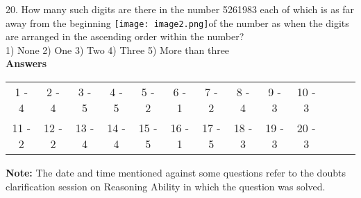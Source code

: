 \documentclass[
]{article}
\begin{document}
20. How many such digits are there in the number 5261983 each of which is as far away from
the beginning \texttt{[image: image2.png]}of the number as when the digits are arranged in the ascending order within
the number?\\
1) None \hspace{2mm}2) One \hspace{2mm}3) Two \hspace{2mm}4) Three \hspace{2mm}5) More than three\\

\textbf{Answers}\\
\begin{tabular}{c c c c c c c c c c c c c}
1 - 4 &2 - 4& 3 - 5 &4 - 5 &5 - 2 &6 - 1 &7 - 2& 8 - 4& 9 - 3& 10 - 3\\
11 - 2 &12 - 2 &13 - 4 &14 - 4 &15 - 5 &16 - 1 &17 - 5 &18 - 3 &19 - 3 &20 - 3\\
\end{tabular}


\textbf{Note:} The date and time mentioned against some questions refer to the doubts clarification
session on Reasoning Ability in which the question was solved.
\end{document}
